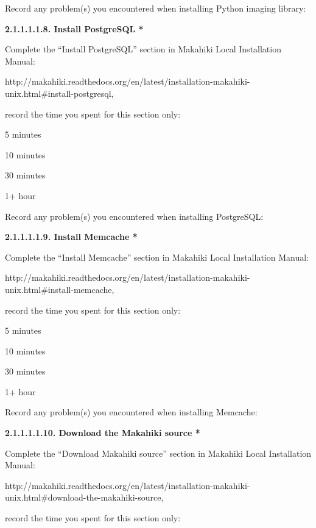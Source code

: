 Record any problem(s) you encountered when installing Python imaging library: \underline{\hspace{3cm}}

{\bf 2.1.1.1.1.8. Install PostgreSQL *}

Complete the ``Install PostgreSQL'' section in Makahiki Local Installation Manual:

http://makahiki.readthedocs.org/en/latest/installation-makahiki-unix.html\#install-postgresql, 

record the time you spent for this section only:

\begin{radiobutton}
\item 5 minutes
\item  10 minutes
\item  30 minutes
\item  1+ hour
\end{radiobutton}

Record any problem(s) you encountered when installing PostgreSQL: \underline{\hspace{4cm}}

{\bf 2.1.1.1.1.9. Install Memcache *}

Complete the ``Install Memcache'' section in Makahiki Local Installation Manual:

http://makahiki.readthedocs.org/en/latest/installation-makahiki-unix.html\#install-memcache, 

record the time you spent for this section only:

\begin{radiobutton}
\item 5 minutes
\item  10 minutes
\item  30 minutes
\item  1+ hour
\end{radiobutton}

Record any problem(s) you encountered when installing Memcache: \underline{\hspace{4cm}}

{\bf 2.1.1.1.1.10. Download the Makahiki source *}

Complete the ``Download Makahiki source'' section in Makahiki Local Installation Manual:

http://makahiki.readthedocs.org/en/latest/installation-makahiki-unix.html\#download-the-makahiki-source, 

record the time you spent for this section only:

